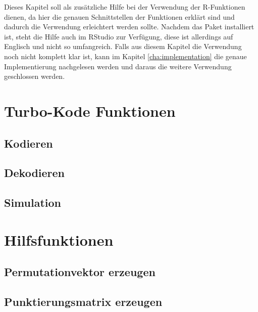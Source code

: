 
Dieses Kapitel soll als zusätzliche Hilfe bei der Verwendung der R-Funktionen dienen, da hier die genauen Schnittstellen der Funktionen erklärt sind und dadurch die Verwendung erleichtert werden sollte. Nachdem das Paket installiert ist, steht die Hilfe auch im RStudio zur Verfügung, diese ist allerdings auf Englisch und nicht so umfangreich. Falls aus diesem Kapitel die Verwendung noch nicht komplett klar ist, kann im Kapitel \ref{cha:implementation} die genaue Implementierung nachgelesen werden und daraus die weitere Verwendung geschlossen werden.
\section{Turbo-Kode Funktionen}

\subsection{Kodieren}
\label{sec:interface_encode}


\subsection{Dekodieren}
\label{sec:interface_decode}


\subsection{Simulation}
\label{sec:interface_simulation}


\section{Hilfsfunktionen}

\subsection{Permutationvektor erzeugen}
\label{sec:interface_permutation}


\subsection{Punktierungsmatrix erzeugen}
\label{sec:interface_punctuation}


